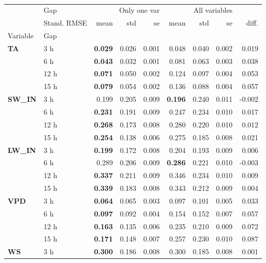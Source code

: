 \begin{table}
\centering
\caption{\CapGapSingle}
\label{tbl:gap_single_var}
\begin{tabular}{p{2.1cm}l|rrr|rrr|r}
\toprule
 & Gap & \multicolumn{3}{r}{Only one var} & \multicolumn{3}{r}{All variables} &  \\
 & Stand. RMSE & mean & std & se & mean & std & se & diff. \\
Variable & Gap &  &  &  &  &  &  &  \\
\midrule
\multirow[c]{4}{*}{\textbf{TA}} & 3 h & \bfseries 0.029 & 0.026 & 0.001 & 0.048 & 0.040 & 0.002 & 0.019 \\
 & 6 h & \bfseries 0.043 & 0.032 & 0.001 & 0.081 & 0.063 & 0.003 & 0.038 \\
 & 12 h & \bfseries 0.071 & 0.050 & 0.002 & 0.124 & 0.097 & 0.004 & 0.053 \\
 & 15 h & \bfseries 0.079 & 0.054 & 0.002 & 0.136 & 0.088 & 0.004 & 0.057 \\
\cline{1-9}
\multirow[c]{4}{*}{\textbf{SW\_IN}} & 3 h & 0.199 & 0.205 & 0.009 & \bfseries 0.196 & 0.240 & 0.011 & -0.002 \\
 & 6 h & \bfseries 0.231 & 0.191 & 0.009 & 0.247 & 0.234 & 0.010 & 0.017 \\
 & 12 h & \bfseries 0.268 & 0.173 & 0.008 & 0.280 & 0.220 & 0.010 & 0.012 \\
 & 15 h & \bfseries 0.254 & 0.138 & 0.006 & 0.275 & 0.185 & 0.008 & 0.021 \\
\cline{1-9}
\multirow[c]{4}{*}{\textbf{LW\_IN}} & 3 h & \bfseries 0.199 & 0.172 & 0.008 & 0.204 & 0.193 & 0.009 & 0.006 \\
 & 6 h & 0.289 & 0.206 & 0.009 & \bfseries 0.286 & 0.221 & 0.010 & -0.003 \\
 & 12 h & \bfseries 0.337 & 0.211 & 0.009 & 0.346 & 0.234 & 0.010 & 0.009 \\
 & 15 h & \bfseries 0.339 & 0.183 & 0.008 & 0.343 & 0.212 & 0.009 & 0.004 \\
\cline{1-9}
\multirow[c]{4}{*}{\textbf{VPD}} & 3 h & \bfseries 0.064 & 0.065 & 0.003 & 0.097 & 0.101 & 0.005 & 0.033 \\
 & 6 h & \bfseries 0.097 & 0.092 & 0.004 & 0.154 & 0.152 & 0.007 & 0.057 \\
 & 12 h & \bfseries 0.163 & 0.135 & 0.006 & 0.235 & 0.210 & 0.009 & 0.072 \\
 & 15 h & \bfseries 0.171 & 0.148 & 0.007 & 0.257 & 0.230 & 0.010 & 0.087 \\
\cline{1-9}
\multirow[c]{4}{*}{\textbf{WS}} & 3 h & \bfseries 0.300 & 0.186 & 0.008 & 0.300 & 0.185 & 0.008 & 0.001 \\

\end{tabular}
\end{table}
